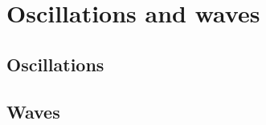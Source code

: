 \chapter{Oscillations and waves}
\label{OscillationsWavesChapter}

\section{Oscillations}

\section{Waves}
